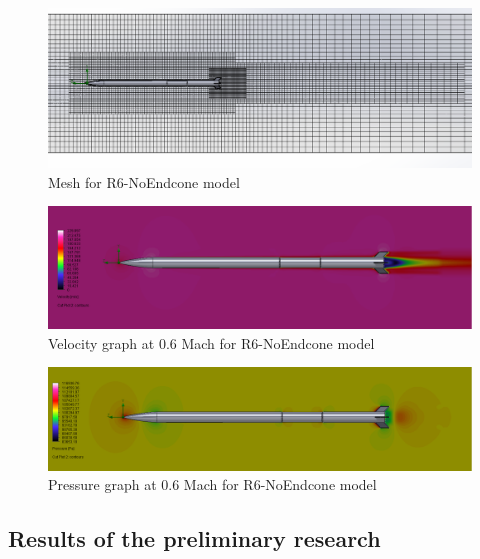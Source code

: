 \documentclass{article}
\begin{document}
\begin{figure}[H]
    \centering
    \includegraphics[width=\textwidth]{../data/R6-NoEndcone-Solid/mesh.png}
    \caption{Mesh for R6-NoEndcone model}
\end{figure}
\begin{figure}[H]
    \centering
    \includegraphics[width=\textwidth]{../data/R6-NoEndcone-Solid/speed.png}
    \caption{Velocity graph at 0.6 Mach for R6-NoEndcone    model}
\end{figure}

\begin{figure}[H]
    \centering
    \includegraphics[width=\textwidth]{../data/R6-NoEndcone-Solid/konospeedoatode.png}
    \caption{Pressure graph at 0.6 Mach for R6-NoEndcone model}
\end{figure}

\subsection{Results of the preliminary research}
\end{document}
